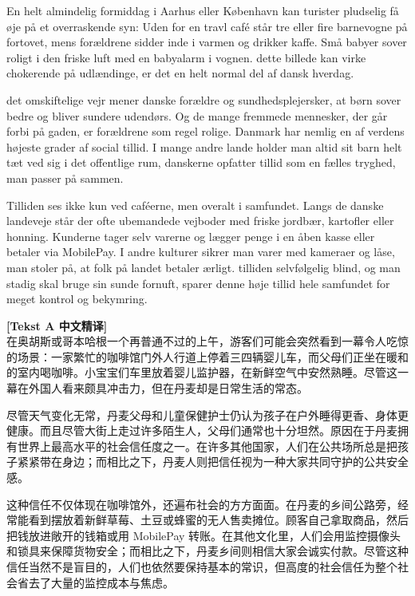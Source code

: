 En helt almindelig formiddag i Aarhus eller København kan turister pludselig få øje på et overraskende syn: Uden for en travl café står tre eller fire barnevogne på fortovet, mens forældrene sidder inde i varmen og drikker kaffe. Små babyer sover roligt i den friske luft med en babyalarm i vognen.  dette billede kan virke chokerende på udlændinge, er det en helt normal del af dansk hverdag.

 det omskiftelige vejr mener danske forældre og sundhedsplejersker, at børn sover bedre og bliver sundere udendørs. Og  de mange fremmede mennesker, der går forbi på gaden, er forældrene som regel rolige. Danmark har nemlig en af verdens højeste grader af social tillid. I mange andre lande holder man altid sit barn helt tæt ved sig i det offentlige rum,  danskerne  opfatter tillid som en fælles tryghed, man passer på sammen.

Tilliden ses ikke kun ved caféerne, men overalt i samfundet. Langs de danske landeveje står der ofte ubemandede vejboder med friske jordbær, kartofler eller honning. Kunderne tager selv varerne og lægger penge i en åben kasse eller betaler via MobilePay. I andre kulturer sikrer man varer med kameraer og låse,  man  stoler på, at folk på landet betaler ærligt.  tilliden selvfølgelig  blind, og man stadig skal bruge sin sunde fornuft, sparer denne høje tillid hele samfundet for meget kontrol og bekymring.

\begin{transbox}
\small
\textbf{\color{NCDTeal}[Tekst A 中文精译]}\\
在奥胡斯或哥本哈根一个再普通不过的上午，游客们可能会突然看到一幕令人吃惊的场景：一家繁忙的咖啡馆门外人行道上停着三四辆婴儿车，而父母们正坐在暖和的室内喝咖啡。小宝宝们车里放着婴儿监护器，在新鲜空气中安然熟睡。尽管这一幕在外国人看来颇具冲击力，但在丹麦却是日常生活的常态。

尽管天气变化无常，丹麦父母和儿童保健护士仍认为孩子在户外睡得更香、身体更健康。而且尽管大街上走过许多陌生人，父母们通常也十分坦然。原因在于丹麦拥有世界上最高水平的社会信任度之一。在许多其他国家，人们在公共场所总是把孩子紧紧带在身边；而相比之下，丹麦人则把信任视为一种大家共同守护的公共安全感。

这种信任不仅体现在咖啡馆外，还遍布社会的方方面面。在丹麦的乡间公路旁，经常能看到摆放着新鲜草莓、土豆或蜂蜜的无人售卖摊位。顾客自己拿取商品，然后把钱放进敞开的钱箱或用 MobilePay 转账。在其他文化里，人们会用监控摄像头和锁具来保障货物安全；而相比之下，丹麦乡间则相信大家会诚实付款。尽管这种信任当然不是盲目的，人们也依然要保持基本的常识，但高度的社会信任为整个社会省去了大量的监控成本与焦虑。
\end{transbox}

